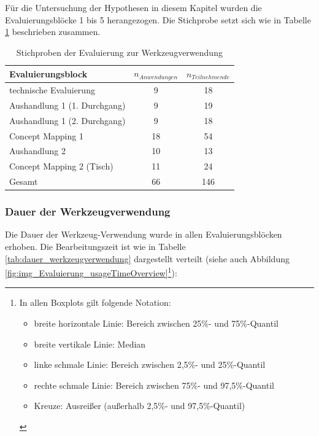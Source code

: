 Für die Untersuchung der Hypothesen in diesem Kapitel wurden die Evaluierungsblöcke 1 bis 5 herangezogen. Die Stichprobe setzt sich wie in Tabelle \ref{tab:stichprobe_tui} beschrieben zusammen.

\begin{table}[htbp]
	\centering
	\caption{Stichproben der Evaluierung zur Werkzeugverwendung}

		\begin{tabular}{| l || c | c |}
		\hline
			Evaluierungsblock & $n_{Anwendungen}$ & $n_{Teilnehmende}$ \\ \hline
			technische Evaluierung		  &  9 & 18 \\
			Aushandlung 1 (1. Durchgang)  &  9 & 19 \\
			Aushandlung 1 (2. Durchgang)  &  9 & 18 \\
			Concept Mapping 1			  & 18 & 54 \\
			Aushandlung 2				  & 10 & 13 \\
			Concept Mapping 2 (Tisch)     & 11 & 24 \\  \hline
			Gesamt						  & 66 & 146 \\ \hline
	\end{tabular}
	\label{tab:stichprobe_tui}
\end{table}

\subsubsection{Dauer der Werkzeugverwendung} %

Die Dauer der Werkzeug-Verwendung wurde in allen Evaluierungsblöcken erhoben. Die Bearbeitungszeit ist wie in Tabelle \ref{tab:dauer_werkzeugverwendung} dargestellt verteilt (siehe auch Abbildung \ref{fig:img_Evaluierung_usageTimeOverview}\footnote{In allen Boxplots gilt folgende Notation: 
\begin{itemize}
	\item breite horizontale Linie: Bereich zwischen 25\%- und 75\%-Quantil
	\item breite vertikale Linie: Median
	\item linke schmale Linie: Bereich zwischen 2,5\%- und 25\%-Quantil
	\item rechte schmale Linie: Bereich zwischen 75\%- und 97,5\%-Quantil
	\item Kreuze: Ausreißer (außerhalb 2,5\%- und 97,5\%-Quantil)
\end{itemize}
}):

